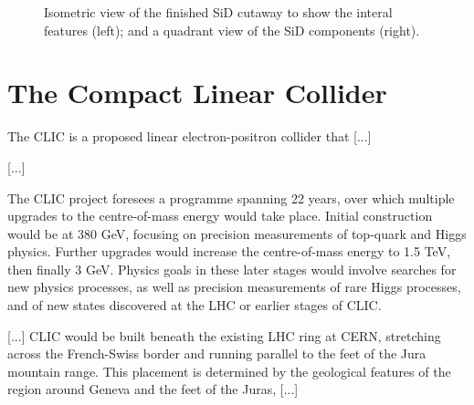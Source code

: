 \begin{figure}[h]%
	\centering
    \qquad
    \caption{Isometric view of the finished \acrshort{SiD} cutaway to show the interal features (left); and a quadrant view of the \acrshort{SiD} components (right).}%
    \label{figure:colliders/ILD/double}%
\end{figure}

\section{The Compact Linear Collider}
The \acrfull{CLIC} is a proposed linear electron-positron collider that [...]

[...]

The CLIC project foresees a programme spanning 22 years, over which multiple upgrades to the centre-of-mass energy would take place. Initial construction would be at 380 GeV, focusing on precision measurements of top-quark and Higgs physics. Further upgrades would increase the centre-of-mass energy to 1.5 TeV, then finally 3 GeV. Physics goals in these later stages would involve searches for new physics processes, as well as precision measurements of rare Higgs processes, and of new states discovered at the LHC or earlier stages of CLIC. 

[...] CLIC would be built beneath the existing LHC ring at CERN, stretching across the French-Swiss border and running parallel to the feet of the Jura mountain range. This placement is determined by the geological features of the region around Geneva and the feet of the Juras, [...]


